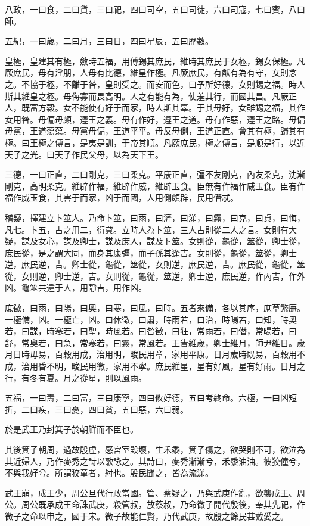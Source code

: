 八政，一曰食，二曰貨，三曰祀，四曰司空，五曰司徒，六曰司寇，七曰賓，八曰師。

五紀，一曰歲，二曰月，三曰日，四曰星辰，五曰歷數。

皇極，皇建其有極，斂時五福，用傅錫其庶民，維時其庶民于女極，錫女保極。凡厥庶民，毋有淫朋，人毋有比德，維皇作極。凡厥庶民，有猷有為有守，女則念之。不協于極，不離于咎，皇則受之。而安而色，曰予所好德，女則錫之福。時人斯其維皇之極。毋侮寡而畏高明。人之有能有為，使羞其行，而國其昌。凡厥正人，既富方穀。女不能使有好于而家，時人斯其辜。于其毋好，女雖錫之福，其作女用咎。毋偏毋頗，遵王之義。毋有作好，遵王之道。毋有作惡，遵王之路。毋偏毋黨，王道蕩蕩。毋黨毋偏，王道平平。毋反毋側，王道正直。會其有極，歸其有極。曰王極之傅言，是夷是訓，于帝其順。凡厥庶民，極之傅言，是順是行，以近天子之光。曰天子作民父母，以為天下王。

三德，一曰正直，二曰剛克，三曰柔克。平康正直，彊不友剛克，內友柔克，沈漸剛克，高明柔克。維辟作福，維辟作威，維辟玉食。臣無有作福作威玉食。臣有作福作威玉食，其害于而家，凶于而國，人用側頗辟，民用僭忒。

稽疑，擇建立卜筮人。乃命卜筮，曰雨，曰濟，曰涕，曰霧，曰克，曰貞，曰悔，凡七。卜五，占之用二，衍貣。立時人為卜筮，三人占則從二人之言。女則有大疑，謀及女心，謀及卿士，謀及庶人，謀及卜筮。女則從，龜從，筮從，卿士從，庶民從，是之謂大同，而身其康彊，而子孫其逢吉。女則從，龜從，筮從，卿士逆，庶民逆，吉。卿士從，龜從，筮從，女則逆，庶民逆，吉。庶民從，龜從，筮從，女則逆，卿士逆，吉。女則從，龜從，筮逆，卿士逆，庶民逆，作內吉，作外凶。龜筮共違于人，用靜吉，用作凶。

庶徵，曰雨，曰陽，曰奧，曰寒，曰風，曰時。五者來備，各以其序，庶草繁廡。一極備，凶。一極亡，凶。曰休徵，曰肅，時雨若，曰治，時暘若，曰知，時奧若，曰謀，時寒若，曰聖，時風若。曰咎徵，曰狂，常雨若，曰僭，常暘若，曰舒，常奧若，曰急，常寒若，曰霧，常風若。王眚維歲，卿士維月，師尹維日。歲月日時毋易，百穀用成，治用明，畯民用章，家用平康。日月歲時既易，百穀用不成，治用昏不明，畯民用微，家用不寧。庶民維星，星有好風，星有好雨。日月之行，有冬有夏。月之從星，則以風雨。

五福，一曰壽，二曰富，三曰康寧，四曰攸好德，五曰考終命。六極，一曰凶短折，二曰疾，三曰憂，四曰貧，五曰惡，六曰弱。

於是武王乃封箕子於朝鮮而不臣也。

其後箕子朝周，過故殷虛，感宮室毀壞，生禾黍，箕子傷之，欲哭則不可，欲泣為其近婦人，乃作麥秀之詩以歌詠之。其詩曰，麥秀漸漸兮，禾黍油油。彼狡僮兮，不與我好兮。所謂狡童者，紂也。殷民聞之，皆為流涕。

武王崩，成王少，周公旦代行政當國。管、蔡疑之，乃與武庚作亂，欲襲成王、周公。周公既承成王命誅武庚，殺管叔，放蔡叔，乃命微子開代殷後，奉其先祀，作微子之命以申之，國于宋。微子故能仁賢，乃代武庚，故殷之餘民甚戴愛之。


